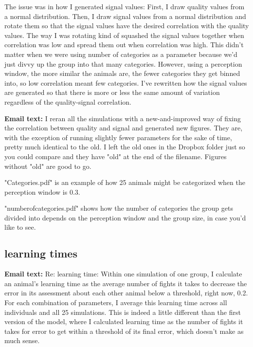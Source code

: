 The issue was in how I generated signal values: First, I draw quality values from a normal distribution. Then, I draw signal values from a normal distribution and rotate them so that the signal values have the desired correlation with the quality values. The way I was rotating kind of squashed the signal values together when correlation was low and spread them out when correlation was high. This didn't matter when we were using number of categories as a parameter because we'd just divvy up the group into that many categories. However, using a perception window, the more similar the animals are, the fewer categories they get binned into, so low correlation meant few categories. I've rewritten how the signal values are generated so that there is more or less the same amount of variation regardless of the quality-signal correlation.

\textbf{Email text: }I reran all the simulations with a new-and-improved way of fixing the correlation between quality and signal and generated new figures. They are, with the exception of running slightly fewer parameters for the sake of time, pretty much identical to the old. I left the old ones in the Dropbox folder just so you could compare and they have "old" at the end of the filename. Figures without "old" are good to go.

"Categories.pdf" is an example of how 25 animals might be categorized when the perception window is 0.3.

"numberofcategories.pdf" shows how the number of categories the group gets divided into depends on the perception window and the group size, in case you'd like to see.
%
\subsection*{learning times}
%
\textbf{Email text:} Re: learning time: Within one simulation of one group, I calculate an animal's learning time as the average number of fights it takes to decrease the error in its assessment about each other animal below a threshold, right now, 0.2. For each combination of parameters, I average this learning time across all individuals and all 25 simulations. This is indeed a little different than the first version of the model, where I calculated learning time as the number of fights it takes for error to get within a threshold of its final error, which doesn't make as much sense.

